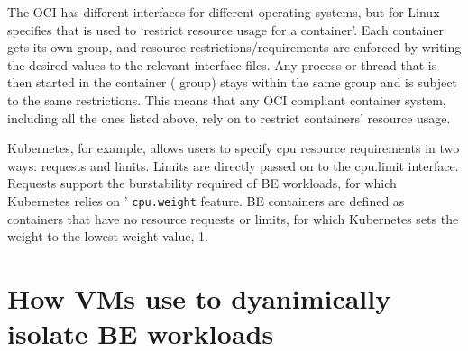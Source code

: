 The OCI has different interfaces for different operating systems, but for Linux
specifies that \cgroups{} is used to `restrict resource usage for a container'.
Each container gets its own group, and resource restrictions/requirements are
enforced by writing the desired values to the relevant \cgroups{} interface
files. Any process or thread that is then started in the container (\ie{} group)
stays within the same group and is subject to the same restrictions. This means
that any OCI compliant container system, including all the ones listed above,
rely on \cgroups{} to restrict containers' resource usage.

Kubernetes\cite{TODO}, for example, allows users to specify cpu resource
requirements in two ways: requests and limits. Limits are directly passed on to
the \cgroups{} cpu.limit interface. Requests support the burstability required
of BE workloads, for which Kubernetes relies on \cgroups{}' \texttt{cpu.weight}
feature. BE containers are defined as containers that have no resource requests
or limits, for which Kubernetes sets the weight to the lowest weight value,
\ie{} 1.










\section{How VMs use \cgroups{} to dyanimically isolate BE workloads}

